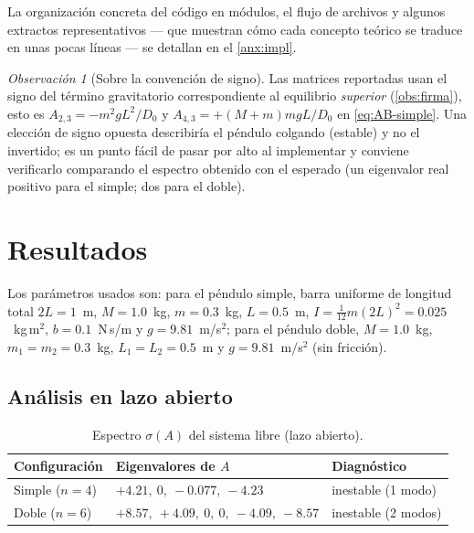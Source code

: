 \documentclass[11pt,letterpaper]{article}
\theoremstyle{definition}
\theoremstyle{plain}
\theoremstyle{remark}
\newtheorem{observacion}[definicion]{Observación}
\begin{document}
La organización concreta del código en módulos, el flujo de archivos y algunos
extractos representativos --- que muestran cómo cada concepto teórico se traduce
en unas pocas líneas --- se detallan en el \cref{anx:impl}.

\begin{observacion}[Sobre la convención de signo]
\label{obs:signo}
Las matrices reportadas usan el signo del término gravitatorio
correspondiente al equilibrio \emph{superior} (\cref{obs:firma}), esto es
$A_{2,3}=-m^2gL^2/D_0$ y $A_{4,3}=+(M{+}m)mgL/D_0$ en \cref{eq:AB-simple}.
Una elección de signo opuesta describiría el péndulo colgando (estable) y
no el invertido; es un punto fácil de pasar por alto al implementar y
conviene verificarlo comparando el espectro obtenido con el esperado (un
eigenvalor real positivo para el simple; dos para el doble).
\end{observacion}

\section{Resultados}
\label{sec:result}

Los parámetros usados son: para el péndulo simple, barra uniforme de
longitud total $2L=1$~m, $M=1.0$~kg, $m=0.3$~kg, $L=0.5$~m,
$I=\tfrac{1}{12}m(2L)^2=0.025$~kg\,m$^2$, $b=0.1$~N\,s/m y
$g=9.81$~m/s$^2$; para el péndulo doble, $M=1.0$~kg, $m_1=m_2=0.3$~kg,
$L_1=L_2=0.5$~m y $g=9.81$~m/s$^2$ (sin fricción).

\subsection{Análisis en lazo abierto}

\begin{table}[htbp]
  \centering
  \caption{Espectro $\sigma(A)$ del sistema libre (lazo abierto).}
  \label{tab:abierto}
  \begin{tabular}{@{}lll@{}}
    \toprule
    \textbf{Configuración} & \textbf{Eigenvalores de $A$} & \textbf{Diagnóstico}\\
    \midrule
    Simple ($n=4$) & $+4.21,\ 0,\ -0.077,\ -4.23$ & inestable (1 modo)\\
    Doble ($n=6$)  & $+8.57,\ +4.09,\ 0,\ 0,\ -4.09,\ -8.57$ & inestable (2 modos)\\
    \bottomrule
  \end{tabular}
\end{table}
\end{document}

